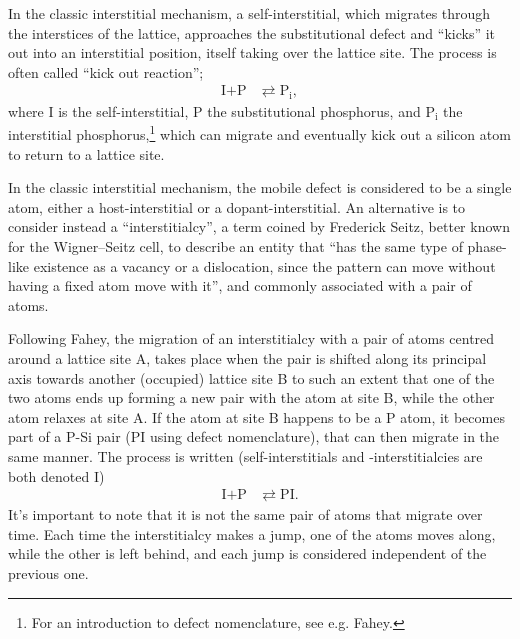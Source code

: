 \documentclass[11pt,bibliography=totoc,index=totoc]{scrbook}   %
\begin{document}
In the classic interstitial mechanism, a self-interstitial, which migrates through the interstices of the lattice, 
approaches the substitutional defect and ``kicks'' it out into an interstitial position, 
itself taking over the lattice site. 
The process is often called ``kick out reaction'';\cite{Fahey:1989}
\begin{align*}
    \text{I} + \text{P} &\rightleftarrows \text{P}_{\text{i}},
\end{align*}
where I is the self-interstitial, P the substitutional phosphorus, and P$_{\text{i}}$ the interstitial phosphorus,\footnote{For an introduction to defect nomenclature, see e.g. Fahey\cite{Fahey:1989}.} which can migrate and eventually kick out a silicon atom to return to a lattice site.


In the classic interstitial mechanism, the mobile defect is considered to be a single atom, either a host-interstitial or a dopant-interstitial. 
An alternative is to consider instead a ``interstitialcy'', a term coined by Frederick Seitz, better known for the Wigner–Seitz cell, to describe an entity that ``has the same type of phase-like existence as a vacancy or a dislocation, since the pattern can move without having a fixed atom move with it'',\cite{Seitz:1950} 
and commonly associated with a pair of atoms.

Following Fahey,\cite[322]{Fahey:1989} the migration of an interstitialcy with a pair of atoms centred around a lattice site A, takes place when the pair is shifted along its principal axis towards another (occupied) lattice site B to such an extent that one of the two atoms ends up forming a new pair with the atom at site B, while the other atom relaxes at site A. 
If the atom at site B happens to be a P atom, it becomes part of a P-Si pair (PI using defect nomenclature), 
that can then migrate in the same manner.
The process is written (self-interstitials and -interstitialcies are both denoted I)
\begin{align*}
    \text{I} + \text{P} &\rightleftarrows \text{PI}.
\end{align*}
It's important to note that it is not the same pair of atoms that migrate over time.
Each time the interstitialcy makes a jump, one of the atoms moves along, while the other is left behind,
and each jump is considered independent of the previous one.\cite[323]{Fahey:1989}

\end{document}
